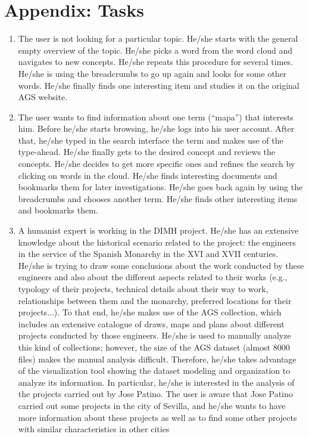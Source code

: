 \documentclass[11pt]{report}
\begin{document}
\chapter{Appendix: Tasks}
\label{app:tasks}
\begin{enumerate}
	\item The user is not looking for a particular topic. He/she starts with the general empty overview of the topic. He/she picks a word from the word cloud and navigates to new concepts. He/she repeats this procedure for several times. He/she is using the breadcrumbs to go up again and looks for some other words. He/she finally finds one interesting item and studies it on the original AGS website.
	\item The user wants to find information about one term (``mapa'') that interests him. Before he/she starts browsing, he/she logs into his user account. After that, he/she typed in the search interface the term and makes use of the type-ahead. He/she finally gets to the desired concept and reviews the concepts. He/she decides to get more specific ones and refines the search by clicking on words in the cloud. He/she finds interesting documents and bookmarks them for later investigations. He/she goes back again by using the breadcrumbs and chooses another term. He/she finds other interesting items and bookmarks them.
	\item A humanist expert is working in the DIMH project. He/she has an extensive knowledge about the historical scenario related to the project: the engineers in the service of the Spanish Monarchy in the XVI and XVII centuries. He/she is trying to draw some conclusions about the work conducted by these engineers and also about the different aspects related to their works (e.g., typology of their projects, technical details about their way to work, relationships between them and the monarchy, preferred locations for their projects...). To that end, he/she makes use of the AGS collection, which includes an extensive catalogue of draws, maps and plans about different projects conducted by those engineers.
He/she is used to manually analyze this kind of collections; however, the size of the AGS dataset (almost 8000 files) makes the manual analysis difficult. Therefore, he/she takes advantage of the visualization tool showing the dataset modeling and organization to analyze its information.
In particular, he/she is interested in the analysis of the projects carried out by Jose Patino. The user is aware that Jose Patino carried out some projects in the city of Sevilla, and he/she wants to have more information about these projects as well as to find some other projects with similar characteristics in other cities

\end{enumerate}
\end{document}
